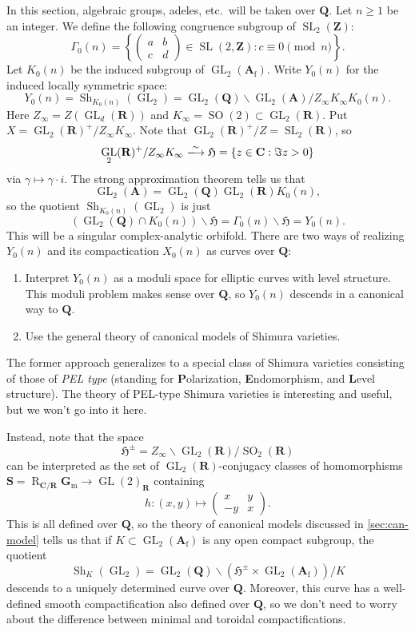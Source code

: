 \documentclass[oneside]{amsart}
\DeclareMathOperator{\GL}{GL}
\DeclareMathOperator{\restrict}{R}
\DeclareMathOperator{\shimura}{Sh}
\DeclareMathOperator{\SL}{SL}
\DeclareMathOperator{\SO}{SO}
\newcommand{\dA}{\mathbf{A}}
\newcommand{\dC}{\mathbf{C}}
\newcommand{\dG}{\mathbf{G}}
\newcommand{\dR}{\mathbf{R}}
\newcommand{\dQ}{\mathbf{Q}}
\newcommand{\dS}{\mathbf{S}}
\newcommand{\dZ}{\mathbf{Z}}
\newcommand{\fH}{\mathfrak{H}}
\newcommand{\finite}{\mathrm{f}}
\newcommand{\iso}{\xlongrightarrow\sim}
\newcommand{\mult}{\mathrm{m}}
\begin{document}
In this section, algebraic groups, adeles, etc.~will be taken over $\dQ$. 
Let $n\geqslant 1$ be an integer. We define the following congruence subgroup 
of $\SL_2(\dZ)$:
\[
  \Gamma_0(n) = \left\{\begin{pmatrix}a & b \\ c & d \end{pmatrix}\in \SL(2,\dZ) : c\equiv 0\pmod n\right\} .
\]
Let $K_0(n)$ be the induced subgroup of $\GL_2(\dA_\finite)$. Write $Y_0(n)$ 
for the induced locally symmetric space: 
\[
  Y_0(n) = \shimura_{K_0(n)}(\GL_2) = \GL_2(\dQ)\backslash \GL_2(\dA) / Z_\infty K_\infty K_0(n) .
\]
Here $Z_\infty=Z(\GL_d(\dR))$ and $K_\infty=\SO(2)\subset \GL_2(\dR)$. Put 
$X=\GL_2(\dR)^+/Z_\infty K_\infty$. Note that $\GL_2(\dR)^+/Z = \SL_2(\dR)$, so 
\[
  \GL_2(\dR)^+ / Z_\infty K_\infty \iso \fH = \{z\in \dC:\Im z>0\} 
\]
via $\gamma\mapsto \gamma\cdot i$. The strong approximation theorem tells us 
that 
\[
  \GL_2(\dA) = \GL_2(\dQ) \GL_2(\dR) K_0(n),
\]
so the quotient $\shimura_{K_0(n)}(\GL_2)$ is just 
\[
  (\GL_2(\dQ)\cap K_0(n))\backslash \fH = \Gamma_0(n) \backslash \fH = Y_0(n).
\]
This will be a singular complex-analytic orbifold. There are two ways of 
realizing $Y_0(n)$ and its compactication $X_0(n)$ as curves over $\dQ$: 
\begin{enumerate}
  \item Interpret $Y_0(n)$ as a moduli space for elliptic curves with level 
    structure. This moduli problem makes sense over $\dQ$, so $Y_0(n)$ descends 
    in a canonical way to $\dQ$. 
  \item Use the general theory of canonical models of Shimura varieties. 
\end{enumerate}
The former approach generalizes to a special class of Shimura varieties 
consisting of those of \emph{PEL type} (standing for 
\textbf{P}olarization, \textbf{E}ndomorphism, and \textbf{L}evel structure). 
The theory of PEL-type Shimura varieties is interesting and useful, but we 
won't go into it here. 

Instead, note that the space 
\[
  \fH^\pm = Z_\infty \backslash \GL_2(\dR) / \SO_2(\dR) 
\]
can be interpreted as the set of $\GL_2(\dR)$-conjugacy classes of 
homomorphisms $\dS=\restrict_{\dC/\dR}\dG_\mult\to \GL(2)_\dR$ containing 
\[
  h:(x,y)\mapsto \begin{pmatrix} x & y \\ -y & x \end{pmatrix} .
\]
This is all defined over $\dQ$, so the theory of canonical models discussed 
in \autoref{sec:can-model} tells us that if 
$K\subset\GL_2(\dA_\finite)$ is any open compact subgroup, the quotient 
\[
  \shimura_K(\GL_2) = \GL_2(\dQ)\backslash (\fH^\pm\times \GL_2(\dA_\finite))/K
\]
descends to a uniquely determined curve over $\dQ$. Moreover, this curve has a 
well-defined smooth compactification also defined over $\dQ$, so we don't need 
to worry about the difference between minimal and toroidal compactifications. 
\end{document}
